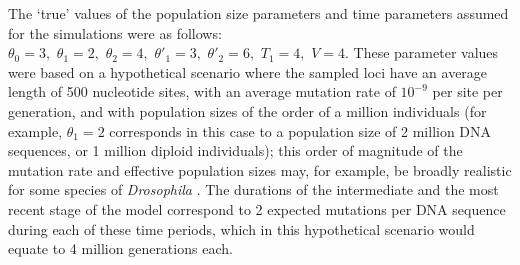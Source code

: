 \documentclass[11pt]{article}
\begin{document}
The `true' values of the population size parameters and time parameters assumed for the simulations were as follows:
$\theta_0=3,\,\, \theta_1=2,\,\, \theta_2=4,\,\, \theta'_1=3,\,\, \theta'_2=6,\,\, T_1=4,\,\, V=4$.
These parameter values were based on a hypothetical scenario where the sampled loci have an average length of 500 nucleotide sites, with an average mutation rate of $10^{-9}$ per site per generation, and with population sizes of the order of a million individuals 
(for example, $\theta_1=2$ corresponds in this case to a population size of 2 million DNA sequences, or 1 million diploid individuals);
this order of magnitude of the mutation rate and effective population sizes may, for example, be broadly realistic for some species of {\em Drosophila} \citep{Wang2010, Keightley2014}.
The durations of the intermediate and the most recent stage of the model correspond to 2 expected mutations per DNA sequence during each of these time periods, which in this hypothetical scenario would equate to 4 million generations each.
\end{document}

